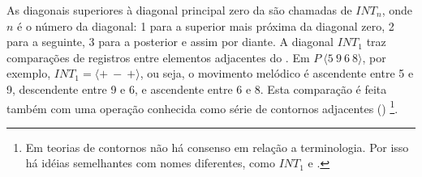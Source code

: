 \begin{table}
  \centering
  \qquad
  \qquad
  \caption{Exemplos de }
  \label{tab:matriz-exemplos}
\end{table}

As diagonais superiores à diagonal principal zero da
 são chamadas de $INT_n$, onde $n$ é o número da
diagonal: 1 para a superior mais próxima da diagonal zero, 2 para a
seguinte, 3 para a posterior e assim por diante. A diagonal $INT_1$
traz comparações de registros entre elementos adjacentes do
. Em $P\:\langle5\:9\:6\:8\rangle$, por exemplo,
$INT_1=\langle+\:-\:+\rangle$, ou seja, o movimento melódico é
ascendente entre 5 e 9, descendente entre 9 e 6, e ascendente entre 6
e 8. Esta comparação é feita também com uma operação conhecida como
série de contornos adjacentes () \footnote{Em teorias de
  contornos não há consenso em relação a terminologia. Por isso há
  idéias semelhantes com nomes diferentes, como $INT_1$ e 
  \cite{friedmann87:response}.}.

